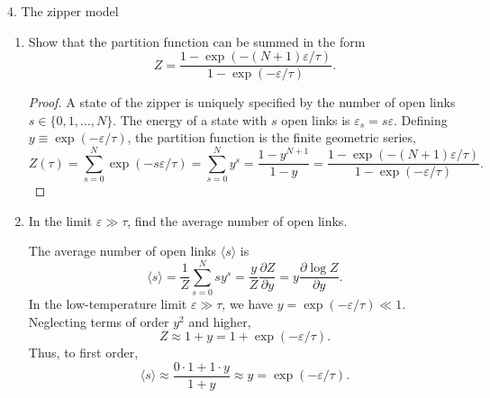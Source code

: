 \documentclass[11pt]{article}
\begin{document}
\begin{problem}{4. The zipper model}\hfill
  \begin{enumerate}[label=(\alph*)]
    \item Show that the partition function can be summed in the form
    \begin{equation}
      Z = \frac{1 - \exp(-(N+1)\varepsilon/\tau)}{1 - \exp(-\varepsilon/\tau)}.
    \end{equation}
    \begin{proof}
      A state of the zipper is uniquely specified by the number of open links \( s \in \{0, 1, \dots, N\} \). The energy of a state with \( s \) open links is \( \varepsilon_s = s\varepsilon \). Defining \( y \equiv \exp(-\varepsilon/\tau) \), the partition function is the finite geometric series,
      \begin{equation}
      \label{eq:17}
        Z(\tau) = \sum_{s=0}^N \exp(-s\varepsilon/\tau) = \sum_{s=0}^N y^s = \frac{1 - y^{N+1}}{1 - y} = \frac{1 - \exp(-(N+1)\varepsilon/\tau)}{1 - \exp(-\varepsilon/\tau)}.
      \end{equation}
    \end{proof}
    \item In the limit \( \varepsilon \gg \tau \), find the average number of open links.
    \begin{answer}
      The average number of open links \( \langle s \rangle \) is
      \begin{equation}
      \label{eq:18}
        \langle s \rangle = \frac{1}{Z} \sum_{s=0}^N s y^s = \frac{y}{Z} \frac{\partial Z}{\partial y} = y \frac{\partial \log Z}{\partial y}.
      \end{equation}
      In the low-temperature limit \( \varepsilon \gg \tau \), we have \( y = \exp(-\varepsilon/\tau) \ll 1 \). Neglecting terms of order \( y^2 \) and higher,
      \begin{equation}
      \label{eq:19}
        Z \approx 1 + y = 1 + \exp(-\varepsilon/\tau).
      \end{equation}
      Thus, to first order,
      \begin{equation}
        \langle s \rangle \approx \frac{0 \cdot 1 + 1 \cdot y}{1 + y} \approx y = \exp(-\varepsilon/\tau).
      \end{equation}
    \end{answer}
  \end{enumerate}
\end{problem}
\end{document}
